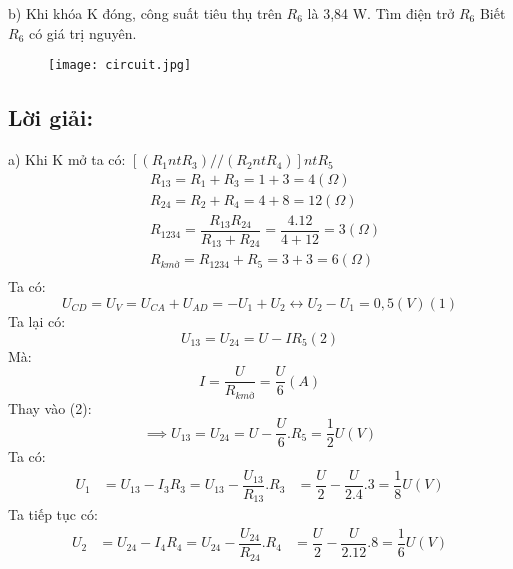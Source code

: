 \documentclass[50pt]{article}
\begin{document}
b) Khi khóa K đóng, công suất tiêu thụ trên $R_{6}$ là 3,84 W. Tìm điện trở $R_{6}$ Biết $R_{6}$ có giá trị nguyên.
\begin{figure}[H]
    \centering
    \texttt{[image: circuit.jpg]}
    \label{fig:enter-label}
\end{figure}
\subsection*{\color[HTML]{4287f5}Lời giải:}
a) Khi K mở ta có: $[(R_{1} nt R_{3}) // (R_{2} nt R_{4})] nt R_{5}$\\
\begin{equation*}
    \begin{aligned}
        & R_{13} = R_{1} + R_{3} = 1 + 3 = 4 (\Omega)\\
        & R_{24} = R_{2} + R_{4} = 4 + 8 = 12 (\Omega)\\
        & R_{1234} = \dfrac{R_{13}R_{24}}{R_{13} + R_{24}} = \dfrac{4.12}{4 + 12} = 3 (\Omega) \\
        & R_{k mở} = R_{1234} + R_{5} = 3 + 3 = 6 (\Omega) \\
    \end{aligned}
\end{equation*}
Ta có:
\begin{equation*}
    U_{CD} = U_{V} = U_{CA} + U_{AD} = -U_{1} + U_{2}
    \leftrightarrow U_{2} - U_{1} = 0,5 (V) (1)
\end{equation*}
Ta lại có:
\begin{equation*}
    U_{13} = U_{24} = U - IR_{5} (2)
\end{equation*}
Mà:
\begin{equation*}
    I = \dfrac{U}{R_{k mở}} = \dfrac{U}{6} (A)
\end{equation*}
Thay vào (2):
\begin{equation*}
    \implies U_{13} = U_{24} = U - \dfrac{U}{6}.R_{5} = \dfrac{1}{2}U (V)
\end{equation*}
Ta có:
\begin{equation*}
    \begin{aligned}
        U_{1} & = U_{13} - I_{3}R_{3} = U_{13} - \dfrac{U_{13}}{R_{13}}.R_{3}
              & = \dfrac{U}{2} - \dfrac{U}{2.4}.3 = \dfrac{1}{8}U (V)
    \end{aligned}
\end{equation*}
Ta tiếp tục có:
\begin{equation*}
    \begin{aligned}
        U_{2} & = U_{24} - I_{4}R_{4} = U_{24} - \dfrac{U_{24}}{R_{24}}.R_{4}
              & = \dfrac{U}{2} - \dfrac{U}{2.12}.8 = \dfrac{1}{6}U (V)
    \end{aligned}
\end{equation*}
\end{document}
